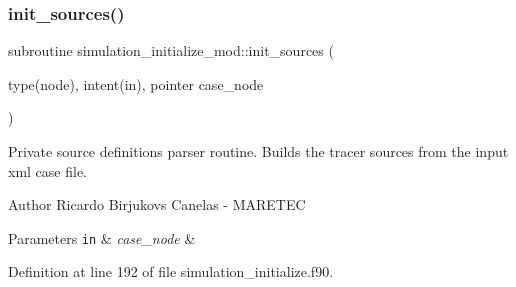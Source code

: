 \subsubsection{\texorpdfstring{init\+\_\+sources()}{init\_sources()}}
{\footnotesize\ttfamily subroutine simulation\+\_\+initialize\+\_\+mod\+::init\+\_\+sources (\begin{DoxyParamCaption}\item[{type(node), intent(in), pointer}]{case\+\_\+node }\end{DoxyParamCaption})\hspace{0.3cm}{\ttfamily [private]}}



Private source definitions parser routine. Builds the tracer sources from the input xml case file. 

\begin{DoxyAuthor}{Author}
Ricardo Birjukovs Canelas -\/ M\+A\+R\+E\+T\+EC 
\end{DoxyAuthor}

\begin{DoxyParams}[1]{Parameters}
\mbox{\tt in}  & {\em case\+\_\+node} & \\
\hline
\end{DoxyParams}


Definition at line 192 of file simulation\+\_\+initialize.\+f90.


